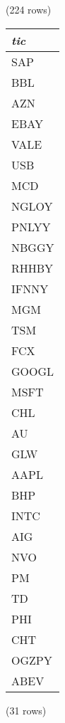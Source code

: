 \noindent (224 rows) \\

\begin{tabular}{l}
\textit{tic} \\
\hline
SAP \\
BBL \\
AZN \\
EBAY \\
VALE \\
USB \\
MCD \\
NGLOY \\
PNLYY \\
NBGGY \\
RHHBY \\
IFNNY \\
MGM \\
TSM \\
FCX \\
GOOGL \\
MSFT \\
CHL \\
AU \\
GLW \\
AAPL \\
BHP \\
INTC \\
AIG \\
NVO \\
PM \\
TD \\
PHI \\
CHT \\
OGZPY \\
ABEV \\
\end{tabular}

\noindent (31 rows) \\

